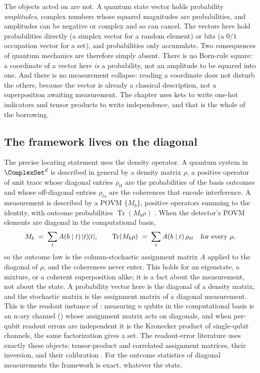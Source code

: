 The objects acted on are not. A quantum state vector holds probability
\emph{amplitudes}, complex numbers whose squared magnitudes are probabilities,
and amplitudes can be negative or complex and so can cancel. The vectors here
hold probabilities directly (a simplex vector for a random element) or bits (a
$0/1$ occupation vector for a set), and probabilities only accumulate. Two
consequences of quantum mechanics are therefore simply absent. There is no
Born-rule square: a coordinate of a vector here \emph{is} a probability, not an
amplitude to be squared into one. And there is no measurement collapse: reading
a coordinate does not disturb the others, because the vector is already a
classical description, not a superposition awaiting measurement. The chapter
uses kets to write one-hot indicators and tensor products to write independence,
and that is the whole of the borrowing.

\subsection*{The framework lives on the diagonal}

The precise locating statement uses the density operator. A quantum
system in $\ComplexSet^{d}$ is described in general by a density matrix
$\rho$, a positive operator of unit trace whose
diagonal entries $\rho_{tt}$ are the probabilities of the basis outcomes
and whose off-diagonal entries $\rho_{ts}$ are the coherences that encode
interference. A measurement is described by a POVM $\{M_b\}$, positive
operators summing to the identity, with outcome probabilities
$\operatorname{Tr}(M_b \rho)$ \parencite{nielsen-chuang-2010}. When the
detector's POVM elements are diagonal in the computational basis,
\[
  M_b \;=\; \sum_t A(b \mid t)\, \lvert t \rangle\!\langle t \rvert,
  \qquad
  \operatorname{Tr}(M_b \rho) \;=\; \sum_t A(b \mid t)\, \rho_{tt}
  \quad \text{for every } \rho,
\]
so the outcome law is the column-stochastic assignment matrix $A$ applied
to the diagonal of $\rho$, and the coherences never enter. This holds for
an eigenstate, a mixture, or a coherent superposition alike; it is a fact
about the measurement, not about the state. A probability vector here is
the diagonal of a density matrix, and the stochastic matrix is the
assignment matrix of a diagonal measurement. This is the readout instance
of : measuring $n$ qubits in
the computational basis is an n-ary channel ()
whose assignment matrix acts on diagonals, and when per-qubit readout
errors are independent it is the Kronecker product of single-qubit
channels, the same factorization  gives a set.
The readout-error literature uses exactly these objects: tensor-product
and correlated assignment matrices, their inversion, and their
calibration
\parencite{bravyi-et-al-2021,nation-et-al-2021,smith-et-al-2021,maciejewski-zimboras-oszmaniec-2020,maciejewski-et-al-2021,hamilton-et-al-2020}.
For the outcome statistics of diagonal measurements the framework is
exact, whatever the state.

